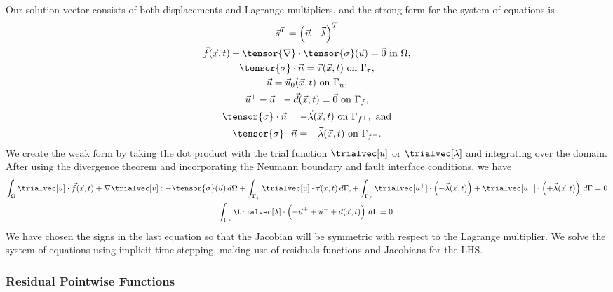 Our solution vector consists of both displacements and Lagrange multipliers, and the strong form for the system of equations is
\begin{gather}
  \vec{s}^T = \left( \vec{u} \quad \vec{\lambda} \right)^T \\
  \vec{f}(\vec{x},t) + \tensor{\nabla} \cdot \tensor{\sigma}(\vec{u}) = \vec{0} \text{ in }\Omega, \\
  \tensor{\sigma} \cdot \vec{n} = \vec{\tau}(\vec{x},t) \text{ on }\Gamma_\tau, \\
  \vec{u} = \vec{u}_0(\vec{x},t) \text{ on }\Gamma_u, \\
  \vec{u}^+ - \vec{u}^- - \vec{d}(\vec{x},t) = \vec{0} \text{ on }\Gamma_f,  \\
  \tensor{\sigma} \cdot \vec{n} = -\vec{\lambda}(\vec{x},t) \text{ on }\Gamma_{f^+}, \text{ and}\\
  \tensor{\sigma} \cdot \vec{n} = +\vec{\lambda}(\vec{x},t) \text{ on }\Gamma_{f^-}.
\end{gather}
We create the weak form by taking the dot product with the trial function $\trialvec[u]$ or $\trialvec[\lambda]$ and integrating over the domain.
After using the divergence theorem and incorporating the Neumann boundary and fault interface conditions, we have
\begin{gather}
  \int_\Omega \trialvec[u] \cdot \vec{f}(\vec{x},t) + \nabla \trialvec[v] : -\tensor{\sigma}(\vec{u}) \, d\Omega
  + \int_{\Gamma_\tau} \trialvec[u] \cdot \vec{\tau}(\vec{x},t) \, d\Gamma,
  + \int_{\Gamma_{f}} \trialvec[u^+] \cdot \left(-\vec{\lambda}(\vec{x},t)\right)
  + \trialvec[u^-] \cdot \left(+\vec{\lambda}(\vec{x},t)\right)\, d\Gamma = 0\\
  \int_{\Gamma_{f}} \trialvec[\lambda] \cdot \left(
    -\vec{u}^+ + \vec{u}^- + \vec{d}(\vec{x},t) \right) \, d\Gamma = 0.
\end{gather}
We have chosen the signs in the last equation so that the Jacobian will be symmetric with respect to the Lagrange multiplier.
We solve the system of equations using implicit time stepping, making use of residuals functions and Jacobians for the LHS.


\subsubsection{Residual Pointwise Functions}


